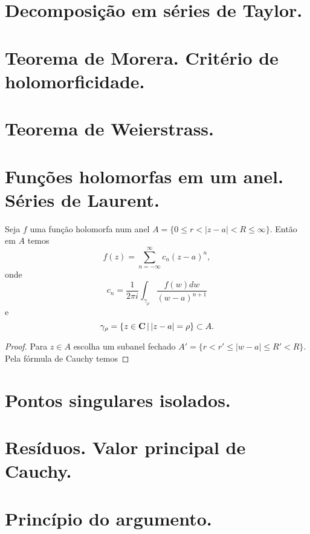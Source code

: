 \section{Decomposição em séries de Taylor.}

\section{Teorema de Morera. Critério de holomorficidade.}

\section{Teorema de Weierstrass.}

\section{Funções holomorfas em um anel. Séries de Laurent.}

\begin{teorema}
Seja $f$ uma função holomorfa num anel $A = \{ 0\leq r < |z-a| < R \leq \infty \}$. Então em $A$ temos
\[ f(z) = \sum_{n=-\infty}^\infty c_n (z-a)^n, \]
onde
\[ c_n = \frac1{2\pi i} \int_{\gamma_\rho} \frac{f(w) dw}{(w-a)^{n+1}} \]
e
\[ \gamma_\rho = \{ z\in\mathbf{C} \,|\, |z-a|=\rho \} \subset A. \]
\end{teorema}
\begin{proof}
Para $z\in A$ escolha um subanel fechado $A' = \{ r < r'\leq |w-a| \leq R' < R \}$.
Pela fórmula de Cauchy temos

\end{proof}


\section{Pontos singulares isolados.}

\section{Resíduos. Valor principal de Cauchy.}

\section{Princípio do argumento.}
\begin{defin}
\end{defin}
\begin{teorema}
\end{teorema}
\begin{teorema}[Rouché]
\end{teorema}
\begin{cor}
\end{cor}

